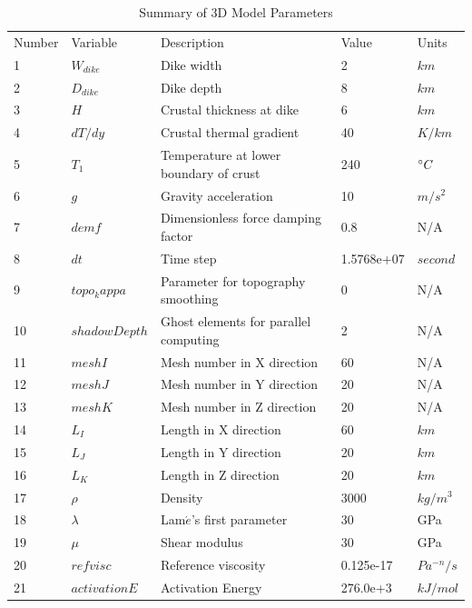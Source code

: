 \documentclass[draft,gc]{agutex}
\begin{document}
\begin{table}
\caption{Summary of 3D Model Parameters}
\centering
  \begin{tabular}[h]{l l p{6.8cm} l l}
\hline
Number & Variable & Description & Value & Units \\ 
1    &  $W_{dike}$    &   Dike width        & 2   &  $km$\\
2    &  $D_{dike}$    &   Dike depth        & 8   &  $km$\\
3    &  $H$    &   Crustal thickness at dike   & 6   &  $km$ \\
4    &  $dT/dy$    &   Crustal thermal gradient        & 40   &  $K/km$ \\
5    &  $T_{1}$    &   Temperature at lower boundary of crust    & 240   &  $\degree C$ \\
6    &  $g$    &   Gravity acceleration    & 10   &  $m/s^{2}$ \\
7    &  $demf$    &   Dimensionless force damping factor   & 0.8   &  N/A  \\
8    &  $dt$    &   Time step    & 1.5768e+07   &  $second$  \\
9    &  $topo_kappa$    &   Parameter for topography smoothing    & 0   &  N/A   \\
10   &  $shadowDepth$    &   Ghost elements for parallel computing   & 2   &  N/A   \\
11   &  $meshI$    &   Mesh number in X direction   & 60   &  N/A   \\
12   &  $meshJ$    &   Mesh number in Y direction      & 20   & N/A  \\
13   &  $meshK$    &   Mesh number in Z direction      & 20   & N/A  \\
14   &  $L_{I}$    &   Length in X direction      & 60   & $km$  \\
15   &  $L_{J}$    &   Length in Y direction      & 20   & $km$  \\
16   &  $L_{K}$    &   Length in Z direction      & 20   & $km$  \\
17   &  $\rho$    &    Density      & 3000   & $kg/m^{3}$  \\
18   &  $\lambda$    &    Lam$\acute{e}$'s first parameter    & 30   & GPa  \\
19   &  $\mu$    &    Shear modulus      & 30   & GPa  \\
20   &  $refvisc$    &    Reference viscosity      & 0.125e-17   & $Pa^{-n}/s$  \\
21   &  $activationE$    &    Activation Energy      & 276.0e+3   & $kJ/mol$  \\

\end{tabular}
\end{table}
\end{document}

